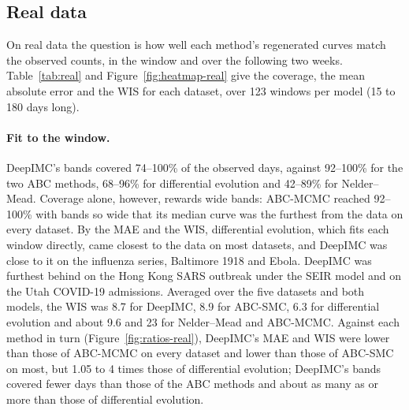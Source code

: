 \documentclass[12pt]{article}
\begin{document}
\begin{table}[htbp]
\centering
\caption{Simulated test windows: DeepIMC's 500 parameter draws started from DeepIMC's estimated state or from
the state fitted to the window by the renewal equation. Starting-state error (percentage points); coverage (\%),
MAE and WIS of the true daily new infections and of the true number currently infectious in the window; coverage
of the next 14 days.}
\label{tab:sim-start}
\small
\resizebox{\textwidth}{!}{}
\end{table}

\subsection{Real data}\label{sec:res-real}

On real data the question is how well each method's regenerated curves match the observed counts, in the
window and over the following two weeks. Table~\ref{tab:real} and Figure~\ref{fig:heatmap-real} give the
coverage, the mean absolute error and the WIS for each dataset, over 123 windows per model (15 to 180 days long).

\paragraph{Fit to the window.} DeepIMC's bands covered 74--100\% of the observed days, against 92--100\% for the
two ABC methods, 68--96\% for differential evolution and 42--89\% for Nelder--Mead. Coverage alone, however,
rewards wide bands: ABC-MCMC reached 92--100\% with bands so wide that its median curve was the furthest from the
data on every dataset. By the MAE and the WIS, differential evolution, which fits each window directly, came
closest to the data on most datasets, and DeepIMC was close to it on the influenza series, Baltimore 1918 and
Ebola. DeepIMC was furthest behind on the Hong Kong SARS outbreak under the SEIR model and on the Utah COVID-19
admissions. Averaged over the five datasets and both models, the WIS was 8.7 for DeepIMC, 8.9 for ABC-SMC, 6.3
for differential evolution and about 9.6 and 23 for Nelder--Mead and ABC-MCMC. Against each method in turn
(Figure~\ref{fig:ratios-real}), DeepIMC's MAE and WIS were lower than those of ABC-MCMC on every dataset and
lower than those of ABC-SMC on most, but 1.05 to 4 times those of differential evolution; DeepIMC's bands
covered fewer days than those of the ABC methods and about as many as or more than those of differential
evolution.
\end{document}
